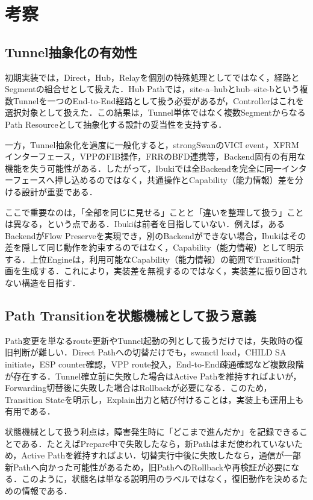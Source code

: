 \documentclass[11pt,a4paper,twoside]{ltjsarticle}
\begin{document}
\section{考察}
\subsection{Tunnel抽象化の有効性}
初期実装では，Direct，Hub，Relayを個別の特殊処理としてではなく，経路とSegmentの組合せとして扱えた．Hub Pathでは，site-a--hubとhub--site-bという複数Tunnelを一つのEnd-to-End経路として扱う必要があるが，Controllerはこれを選択対象として扱えた．この結果は，Tunnel単体ではなく複数SegmentからなるPath Resourceとして抽象化する設計の妥当性を支持する．

一方，Tunnel抽象化を過度に一般化すると，strongSwanのVICI event，XFRM インターフェース，VPPのFIB操作，FRRのBFD連携等，Backend固有の有用な機能を失う可能性がある．したがって，Ibukiでは全Backendを完全に同一インターフェースへ押し込めるのではなく，共通操作とCapability（能力情報）差を分ける設計が重要である．

ここで重要なのは，「全部を同じに見せる」ことと「違いを整理して扱う」ことは異なる，という点である．Ibukiは前者を目指していない．例えば，あるBackendがFlow Preserveを実現でき，別のBackendができない場合，Ibukiはその差を隠して同じ動作を約束するのではなく，Capability（能力情報）として明示する．上位Engineは，利用可能なCapability（能力情報）の範囲でTransition計画を生成する．これにより，実装差を無視するのではなく，実装差に振り回されない構造を目指す．

\subsection{Path Transitionを状態機械として扱う意義}
Path変更を単なるroute更新やTunnel起動の列として扱うだけでは，失敗時の復旧判断が難しい．Direct Pathへの切替だけでも，swanctl load，CHILD SA initiate，ESP counter確認，VPP route投入，End-to-End疎通確認など複数段階が存在する．Tunnel確立前に失敗した場合はActive Pathを維持すればよいが，Forwarding切替後に失敗した場合はRollbackが必要になる．このため，Transition Stateを明示し，Explain出力と結び付けることは，実装上も運用上も有用である．

状態機械として扱う利点は，障害発生時に「どこまで進んだか」を記録できることである．たとえばPrepare中で失敗したなら，新Pathはまだ使われていないため，Active Pathを維持すればよい．切替実行中後に失敗したなら，通信が一部新Pathへ向かった可能性があるため，旧PathへのRollbackや再検証が必要になる．このように，状態名は単なる説明用のラベルではなく，復旧動作を決めるための情報である．
\end{document}
